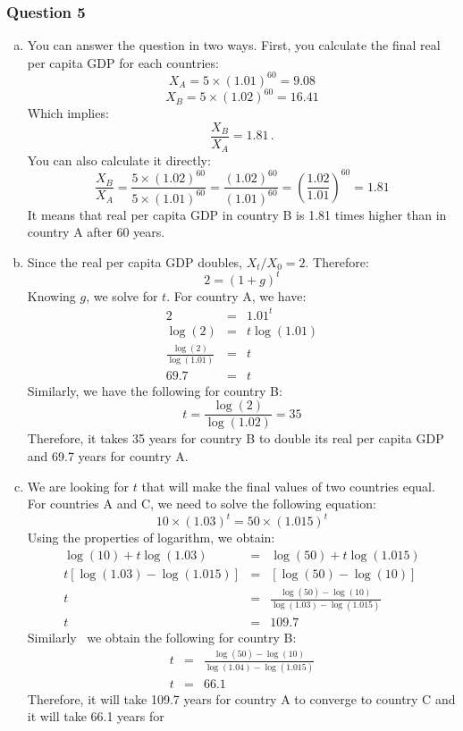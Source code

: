 \documentclass[letterpaper]{article}\usepackage[]{graphicx}\usepackage[]{color}
\numberwithin{exer}{section}
\theoremstyle{nonumberplain}
\begin{document}
\subsubsection*{Question 5}
\begin{enumerate}[a)]
\item You can answer the question in two ways. First, you calculate
  the final real per capita GDP for each countries:
\[
X_A = 5\times(1.01)^{60} = 9.08
\]
\[
X_B = 5\times(1.02)^{60} = 16.41
\]
Which implies:
\[
\frac{X_B}{X_A} = 1.81\,.
\]
You can also calculate it directly:
\[
\frac{X_B}{X_A} = \frac{5\times (1.02)^{60}}{5\times (1.01)^{60}}
= \frac{(1.02)^{60}}{(1.01)^{60}} = \left(\frac{1.02}{1.01}\right)^{60}
=1.81
\]
It means that real per capita GDP in country B is
1.81 times higher than in country A after
60 years.
\item Since the real per capita GDP doubles, $X_t/X_0=2$. Therefore:
\[
2 = (1+g)^t  
\]
Knowing $g$, we solve for $t$. For country A, we have:
\begin{eqnarray*}
2 &=& 1.01^t\\
\log(2) &=& t\log(1.01) \\
\frac{\log(2)}{\log(1.01)} &=& t\\
69.7 &=& t
\end{eqnarray*}
Similarly, we have the following for country B:
\[
t = \frac{\log(2)}{\log(1.02)}  = 35
\]
Therefore, it takes 35 years for
country B to double its real per capita GDP and
69.7 years for country A.
\item We are looking for $t$ that will make the final values of two
  countries equal. For countries A and C, we need to solve the
  following equation:
\[
10\times(1.03)^t = 50\times(1.015)^t
\]
Using the properties of logarithm, we obtain:
\begin{eqnarray*}
\log(10) + t \log(1.03) &=& \log(50)+t\log(1.015)\\
 t [\log(1.03)-\log(1.015)] &=& [\log(50)-\log(10)]\\
 t &=& \frac{\log(50)-\log(10)}{\log(1.03)-\log(1.015)}\\
 t &=&109.7
\end{eqnarray*}
Similarly \, we obtain the following for country B:
\begin{eqnarray*}
 t &=& \frac{\log(50)-\log(10)}{\log(1.04)-\log(1.015)}\\
 t &=&66.1
\end{eqnarray*}
Therefore, it will take
109.7 years for
country A to converge to country C and it will take
66.1 years for

\end{enumerate}
\end{document}
